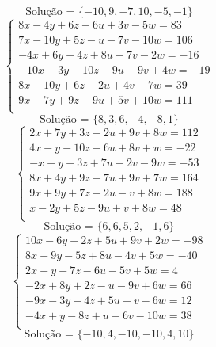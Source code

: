 \documentclass[12pt,oneside,a4paper]{article}
\begin{document}
\begin{equation*}
\text{Solução = }\{-10,9,-7,10,-5,-1\}
\end{equation*}
\vspace{\baselineskip}
\begin{equation*}
\begin{cases}
8x-4y+6z-6u+3v-5w=83 \\
7x-10y+5z-u-7v-10w=106 \\
-4x+6y-4z+8u-7v-2w=-16 \\
-10x+3y-10z-9u-9v+4w=-19 \\
8x-10y+6z-2u+4v-7w=39 \\
9x-7y+9z-9u+5v+10w=111 \\
\end{cases}
\end{equation*}
\begin{equation*}
\text{Solução = }\{8,3,6,-4,-8,1\}
\end{equation*}
\vspace{\baselineskip}
\begin{equation*}
\begin{cases}
2x+7y+3z+2u+9v+8w=112 \\
4x-y-10z+6u+8v+w=-22 \\
-x+y-3z+7u-2v-9w=-53 \\
8x+4y+9z+7u+9v+7w=164 \\
9x+9y+7z-2u-v+8w=188 \\
x-2y+5z-9u+v+8w=48 \\
\end{cases}
\end{equation*}
\begin{equation*}
\text{Solução = }\{6,6,5,2,-1,6\}
\end{equation*}
\vspace{\baselineskip}
\begin{equation*}
\begin{cases}
10x-6y-2z+5u+9v+2w=-98 \\
8x+9y-5z+8u-4v+5w=-40 \\
2x+y+7z-6u-5v+5w=4 \\
-2x+8y+2z-u-9v+6w=66 \\
-9x-3y-4z+5u+v-6w=12 \\
-4x+y-8z+u+6v-10w=38 \\
\end{cases}
\end{equation*}
\begin{equation*}
\text{Solução = }\{-10,4,-10,-10,4,10\}
\end{equation*}
\end{document}

